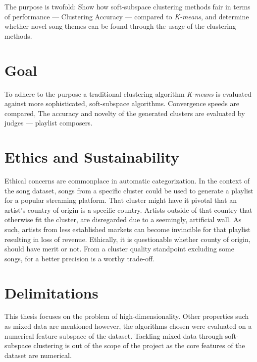 \documentclass[../report.tex]{subfiles}
\begin{document}
The purpose is twofold: Show how soft-subspace clustering methods fair in terms of performance --- Clustering Accuracy --- compared to \textit{K-means}, and determine whether novel song themes can be found through the usage of the clustering methods.

\section{Goal}
To adhere to the purpose a traditional clustering algorithm \textit{K-means} is evaluated against more sophisticated, soft-subspace algorithms.
Convergence speeds are compared, The accuracy and novelty of the generated clusters are evaluated by judges --- playlist composers.

\section{Ethics and Sustainability}
Ethical concerns are commonplace in automatic categorization. In the context of the song dataset, songs from a specific cluster could be used to generate a playlist for a popular streaming platform. That cluster might have it pivotal that an artist's country of origin is a specific country. Artists outside of that country that otherwise fit the cluster, are disregarded due to a seemingly, artificial wall. As such, artists from less established markets can become invincible for that playlist resulting in loss of revenue. Ethically, it is questionable whether county of origin, should have merit or not. From a cluster quality standpoint excluding some songs, for a better precision is a worthy trade-off.

\section{Delimitations}
This thesis focuses on the problem of high-dimensionality. Other properties such as mixed data are mentioned however, the algorithms chosen were evaluated on a numerical feature subspace of the dataset. Tackling mixed data through soft-subspace clustering is out of the scope of the project as the core features of the dataset are numerical.
\end{document}
